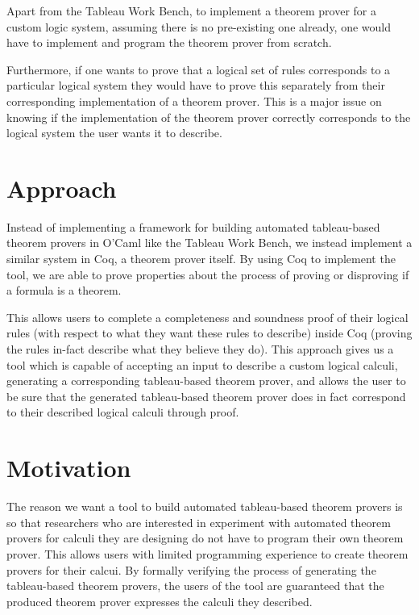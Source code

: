 \documentclass[onecolumn]{report}
\begin{document}
\par

Apart from the Tableau Work Bench, to implement
a theorem prover for a custom logic system, assuming there is no pre-existing
one already, one would have to implement and program the theorem prover from
scratch.

\par

Furthermore, if one wants to prove that a logical set of rules corresponds to
a particular logical system they would have to prove this separately from their
corresponding implementation of a theorem prover. This is a major issue on
knowing if the implementation of the theorem prover correctly corresponds to
the logical system the user wants it to describe.

\section*{Approach}

Instead of implementing a framework for building automated tableau-based
theorem provers in O'Caml like the Tableau Work Bench, we instead implement a
similar system in Coq, a theorem prover itself. By using Coq to implement the
tool, we are able to prove properties about the process of proving or
disproving if a formula is a theorem. 

\par

This allows users to complete a completeness and soundness proof of their
logical rules (with respect to what they want these rules to describe) inside
Coq (proving the rules in-fact describe what they believe they do). This
approach gives us a tool which is capable of accepting an input to describe a
custom logical calculi, generating a corresponding tableau-based theorem
prover, and allows the user to be sure that the generated tableau-based theorem
prover does in fact correspond to their described logical calculi through
proof.

\section*{Motivation}

The reason we want a tool to build automated tableau-based theorem provers is
so that researchers who are interested in experiment with automated theorem
provers for calculi they are designing do not have to program their own
theorem prover. This allows users with limited programming experience to create
theorem provers for their calcui. By formally verifying the process of
generating the tableau-based theorem provers, the users of the tool are
guaranteed that the produced theorem prover expresses the calculi they
described.
\end{document}
